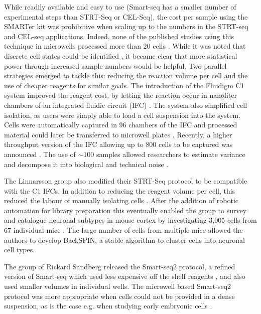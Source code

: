While readily available and easy to use (Smart-seq has a smaller number of experimental steps than STRT-Seq or CEL-Seq), the cost per sample using the SMARTer kit was prohibitive when scaling up to the numbers in the STRT-seq and CEL-seq applications. Indeed, none of the published studies using this technique in microwells processed more than 20 cells \cite{Ramskold2012-zc, Marinov2014-bf, Shalek2013-lw}. While it was noted that discrete cell states could be identified \cite{Shalek2013-lw}, it became clear that more statistical power through increased sample numbers would be helpful. Two parallel strategies emerged to tackle this: reducing the reaction volume per cell and the use of cheaper reagents for similar goals. The introduction of the Fluidigm C1 system improved the reagent cost, by letting the reaction occur in nanoliter chambers of an integrated fluidic circuit (IFC) \cite{Fluidigm_Corporation2013-vw}. The system also simplified cell isolation, as users were simply able to load a cell suspension into the system. Cells were automatically captured in 96 chambers of the IFC and processed material could later be transferred to microwell plates \cite{Wu2014-ot, Brennecke2013-vv}. Recently, a higher throughput version of the IFC allowing up to 800 cells to be captured was announced \cite{Fluidigm_Corporation2016-jl}. The use of \(\sim 100 \) samples allowed researchers to estimate variance and decompose it into biological and technical noise \cite{Brennecke2013-vv, Kim2015-mh}.

The Linnarsson group also modified their STRT-Seq protocol to be compatible with the C1 IFCs. In addition to reducing the reagent volume per cell, this reduced the labour of manually isolating cells \cite{Islam2014-dx}. After the addition of robotic automation for library preparation this eventually enabled the group to survey and catalogue neuronal subtypes in mouse cortex by investigating 3,005 cells from 67 individual mice \cite{Zeisel2015-mk}. The large number of cells from multiple mice allowed the authors to develop BackSPIN, a stable algorithm to cluster cells into neuronal cell types.

The group of Rickard Sandberg released the Smart-seq2 protocol, a refined version of Smart-seq which used less expensive off the shelf reagents \cite{Picelli2013-px, Picelli2014-hr}, and also used smaller volumes in individual wells. The microwell based Smart-seq2 protocol was more appropriate when cells could not be provided in a dense suspension, as is the case e.g. when studying early embryonic cells \cite{Deng2014-ud}.

